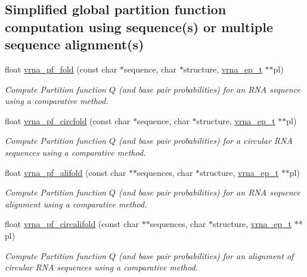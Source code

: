 \subsection*{Simplified global partition function computation using sequence(s) or multiple sequence alignment(s)}
\begin{DoxyCompactItemize}
\item 
float \mbox{\hyperlink{group__part__func__global_gac4a2a74a79e49818bc35412a2b392c7e}{vrna\+\_\+pf\+\_\+fold}} (const char $\ast$sequence, char $\ast$structure, \mbox{\hyperlink{group__struct__utils__plist_gab9ac98ab55ded9fb90043b024b915aca}{vrna\+\_\+ep\+\_\+t}} $\ast$$\ast$pl)
\begin{DoxyCompactList}\small\item\em Compute Partition function $Q$ (and base pair probabilities) for an R\+NA sequence using a comparative method. \end{DoxyCompactList}\item 
float \mbox{\hyperlink{group__part__func__global_ga87e5a77b6e50dd54e9d032a9b92973be}{vrna\+\_\+pf\+\_\+circfold}} (const char $\ast$sequence, char $\ast$structure, \mbox{\hyperlink{group__struct__utils__plist_gab9ac98ab55ded9fb90043b024b915aca}{vrna\+\_\+ep\+\_\+t}} $\ast$$\ast$pl)
\begin{DoxyCompactList}\small\item\em Compute Partition function $Q$ (and base pair probabilities) for a circular R\+NA sequences using a comparative method. \end{DoxyCompactList}\item 
float \mbox{\hyperlink{group__part__func__global_ga374e31a0f326b2c5da5b84e143a63f38}{vrna\+\_\+pf\+\_\+alifold}} (const char $\ast$$\ast$sequences, char $\ast$structure, \mbox{\hyperlink{group__struct__utils__plist_gab9ac98ab55ded9fb90043b024b915aca}{vrna\+\_\+ep\+\_\+t}} $\ast$$\ast$pl)
\begin{DoxyCompactList}\small\item\em Compute Partition function $Q$ (and base pair probabilities) for an R\+NA sequence alignment using a comparative method. \end{DoxyCompactList}\item 
float \mbox{\hyperlink{group__part__func__global_gab70fe6c9a78b79cc5669881720926e1d}{vrna\+\_\+pf\+\_\+circalifold}} (const char $\ast$$\ast$sequences, char $\ast$structure, \mbox{\hyperlink{group__struct__utils__plist_gab9ac98ab55ded9fb90043b024b915aca}{vrna\+\_\+ep\+\_\+t}} $\ast$$\ast$pl)
\begin{DoxyCompactList}\small\item\em Compute Partition function $Q$ (and base pair probabilities) for an alignment of circular R\+NA sequences using a comparative method. \end{DoxyCompactList}\item 

\end{DoxyCompactItemize}
